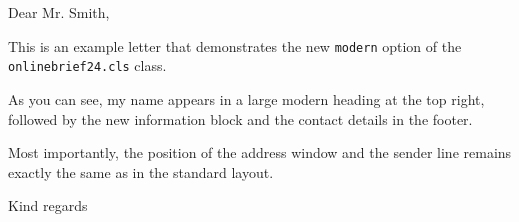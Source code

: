 \documentclass[modern, footercenter, infoblock, lang=english]{../onlinebrief24}
\begin{document}
\begin{letter}{}
    \opening{Dear Mr. Smith,}
    
    This is an example letter that demonstrates the new
    \texttt{modern} option of the \texttt{onlinebrief24.cls} class.
    
    As you can see, my name appears in a large modern heading at the top
    right, followed by the new information block and the contact details in
    the footer.
    
    Most importantly, the position of the address window and the sender line
    remains exactly the same as in the standard layout.
    
    \closing{Kind regards}
\end{letter}
\end{document}
